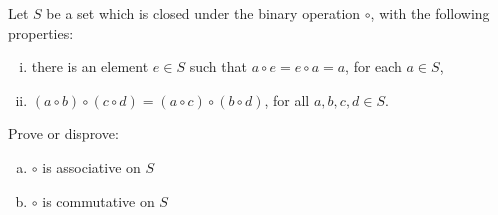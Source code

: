 Let $S$ be a set which is closed under the binary operation $\circ$, with the
following properties:

\begin{enumerate}[(i)]
\item there is an element $e \in S$ such that $a \circ e = e \circ a = a$, for
each $a \in S$,
\item $(a \circ b) \circ (c \circ d) = (a \circ c) \circ (b \circ d)$, for all
$a, b, c, d \in S$.
\end{enumerate}

Prove or disprove:

\begin{enumerate}[(a)]
\item $\circ$ is associative on $S$
\item $\circ$ is commutative on $S$
\end{enumerate}
